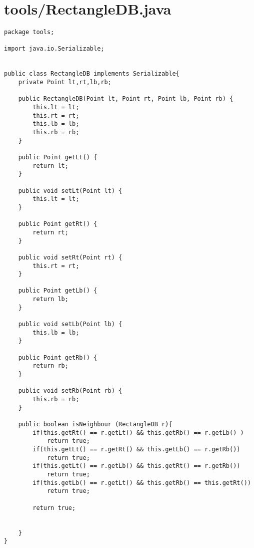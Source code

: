 \documentclass{article}
\begin{document}
\section{tools/RectangleDB.java}
\begin{lstlisting}package tools;

import java.io.Serializable;


public class RectangleDB implements Serializable{
    private Point lt,rt,lb,rb;

    public RectangleDB(Point lt, Point rt, Point lb, Point rb) {
        this.lt = lt;
        this.rt = rt;
        this.lb = lb;
        this.rb = rb;
    }

    public Point getLt() {
        return lt;
    }

    public void setLt(Point lt) {
        this.lt = lt;
    }

    public Point getRt() {
        return rt;
    }

    public void setRt(Point rt) {
        this.rt = rt;
    }

    public Point getLb() {
        return lb;
    }

    public void setLb(Point lb) {
        this.lb = lb;
    }

    public Point getRb() {
        return rb;
    }

    public void setRb(Point rb) {
        this.rb = rb;
    }

    public boolean isNeighbour (RectangleDB r){
        if(this.getRt() == r.getLt() && this.getRb() == r.getLb() )
            return true;
        if(this.getLt() == r.getRt() && this.getLb() == r.getRb())
            return true;
        if(this.getLt() == r.getLb() && this.getRt() == r.getRb())
            return true;
        if(this.getLb() == r.getLt() && this.getRb() == this.getRt())
            return true;

        return true;


    }
}
\end{lstlisting}
\newpage
\end{document}
